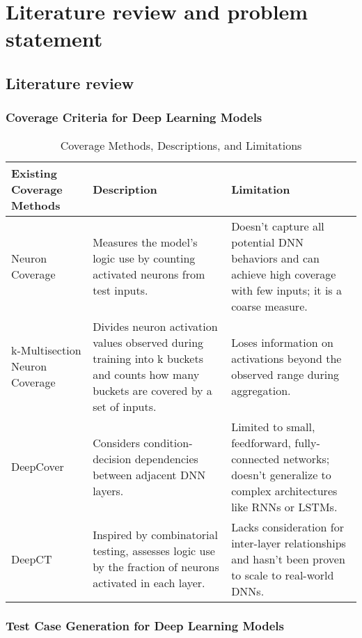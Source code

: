 \chapter[Literature review and problem statement]{Literature review and problem statement}
\label{chp:2}
\newpage
\section{Literature review}

\subsection{Coverage Criteria for Deep Learning Models}

\begin{table}[h]
    \centering
    \begin{tabular}{|p{4cm}|p{5cm}|p{5cm}|}
    \hline
    \textbf{Existing Coverage Methods} & \textbf{Description} & \textbf{Limitation} \\
    \hline
    Neuron Coverage & Measures the model's logic use by counting activated neurons from test inputs. & Doesn't capture all potential DNN behaviors and can achieve high coverage with few inputs; it is a coarse measure. \\
    \hline
    k-Multisection Neuron Coverage & Divides neuron activation values observed during training into k buckets and counts how many buckets are covered by a set of inputs. & Loses information on activations beyond the observed range during aggregation. \\
    \hline
    DeepCover & Considers condition-decision dependencies between adjacent DNN layers. & Limited to small, feedforward, fully-connected networks; doesn't generalize to complex architectures like RNNs or LSTMs. \\
    \hline
    DeepCT & Inspired by combinatorial testing, assesses logic use by the fraction of neurons activated in each layer. & Lacks consideration for inter-layer relationships and hasn't been proven to scale to real-world DNNs. \\
    \hline
    \end{tabular}
    \caption{Coverage Methods, Descriptions, and Limitations}
    \label{table:coverage_methods}
    \end{table}

\subsection{Test Case Generation for Deep Learning Models}

